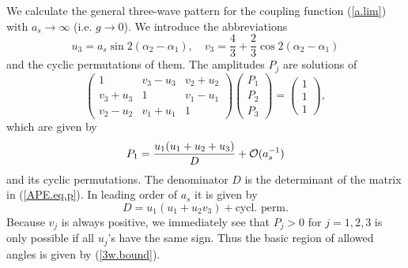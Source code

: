We calculate the general three-wave pattern for the coupling function
(\ref{a.lim}) with $a_s\to\infty$ (i.e. $g\to 0$).  We introduce the
abbreviations
\begin{equation}
  u_3=a_s\sin 2(\alpha_2-\alpha_1),\quad v_3=\frac{4}{3}+\frac{2}{3}
   \cos 2(\alpha_2-\alpha_1)
  \label{APE.uv}
\end{equation}
and the cyclic permutations of them. The amplitudes $P_j$ are
solutions of
\begin{equation}
  \left(\begin{array}{ccc} 1 & v_3-u_3 & v_2+u_2 \\ 
   v_3+u_3 & 1 & v_1-u_1 \\ v_2-u_2 & v_1+u_1 & 1 \end{array}\right)
  \left(\begin{array}{c}  P_1 \\ P_2 \\ P_3  \end{array}\right)=
  \left(\begin{array}{c}  1 \\ 1 \\ 1  \end{array}\right),
  \label{APE.eq.p}
\end{equation}
which are given by
\begin{equation}
  P_1=\frac{u_1(u_1+u_2+u_3)}{D}+{\cal O}(a_s^{-1})
  \label{APE.P}
\end{equation}
and its cyclic permutations. The denominator $D$ is the determinant
of the matrix in (\ref{APE.eq.p}). In leading order of $a_s$ it is 
given by
\begin{equation}
  D=u_1(u_1+u_2v_3)+\mbox{cycl. perm.}
  \label{APE.D}
\end{equation}
Because $v_j$ is always positive, we immediately see that $P_j>0$ for
$j=1,2,3$ is only possible if all $u_j$'s have the same sign. Thus
the basic region of allowed angles is given by (\ref{3w.bound}).

